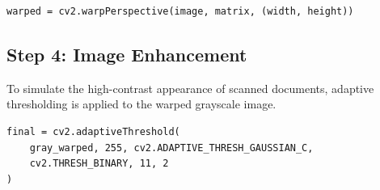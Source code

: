 \documentclass[12pt]{article}
\begin{document}
\begin{verbatim}
warped = cv2.warpPerspective(image, matrix, (width, height))
\end{verbatim}


\subsection{Step 4: Image Enhancement}
To simulate the high-contrast appearance of scanned documents, adaptive thresholding is applied to the warped grayscale image.

\begin{verbatim}
final = cv2.adaptiveThreshold(
    gray_warped, 255, cv2.ADAPTIVE_THRESH_GAUSSIAN_C,
    cv2.THRESH_BINARY, 11, 2
)
\end{verbatim}
\end{document}
